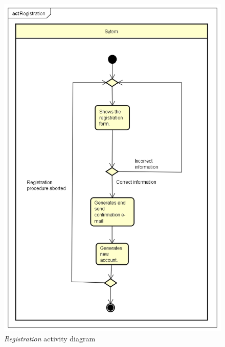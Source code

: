 \begin{figure}[h]
	\includegraphics[width=\textwidth,height=\textheight]{Img/RegistrationAC}
	\caption{\emph{Registration} activity diagram}
	\label{fig:registrationac}
\end{figure}

